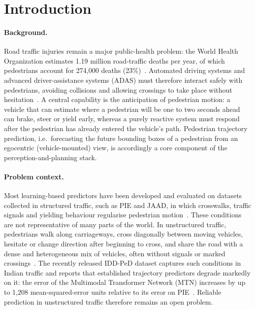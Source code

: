\section{Introduction}\label{sec:intro}
\paragraph{Background.} Road traffic injuries remain a major public-health problem: the World Health Organization estimates 1.19 million road-traffic deaths per year, of which pedestrians account for 274,000 deaths (23\%)~\citep{who2023road}. Automated driving systems and advanced driver-assistance systems (ADAS) must therefore interact safely with pedestrians, avoiding collisions and allowing crossings to take place without hesitation~\citep{iddped2025}. A central capability is the anticipation of pedestrian motion: a vehicle that can estimate where a pedestrian will be one to two seconds ahead can brake, steer or yield early, whereas a purely reactive system must respond after the pedestrian has already entered the vehicle's path. Pedestrian trajectory prediction, i.e.\ forecasting the future bounding boxes of a pedestrian from an egocentric (vehicle-mounted) view, is accordingly a core component of the perception-and-planning stack.

\paragraph{Problem context.} Most learning-based predictors have been developed and evaluated on datasets collected in structured traffic, such as PIE and JAAD, in which crosswalks, traffic signals and yielding behaviour regularise pedestrian motion~\citep{rasouli2019pie,iddped2025}. These conditions are not representative of many parts of the world. In unstructured traffic, pedestrians walk along carriageways, cross diagonally between moving vehicles, hesitate or change direction after beginning to cross, and share the road with a dense and heterogeneous mix of vehicles, often without signals or marked crossings~\citep{iddped2025}. The recently released IDD-PeD dataset captures such conditions in Indian traffic and reports that established trajectory predictors degrade markedly on it: the error of the Multimodal Transformer Network (MTN) increases by up to 1,208 mean-squared-error units relative to its error on PIE~\citep{iddped2025}. Reliable prediction in unstructured traffic therefore remains an open problem.

